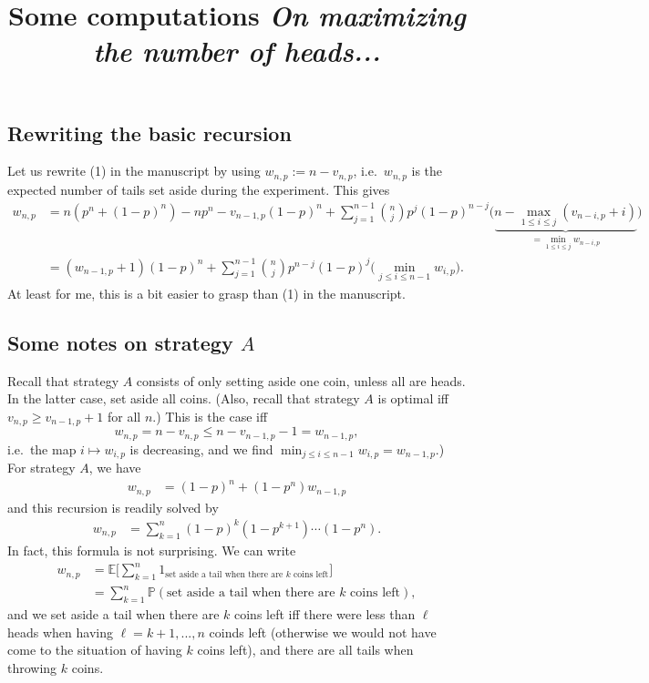 \documentclass{article}
\theoremstyle{definition}
\theoremstyle{step} \newtheorem{step}{Step}
\begin{document}
\title{\LARGE Some computations {\em On maximizing the number of
    heads...}}

\maketitle

\subsection*{Rewriting the basic recursion}
Let us rewrite (1) in the manuscript by using $w_{n,p} := n -
v_{n,p}$, i.e.\ $w_{n,p}$ is the expected number of tails set aside
during the experiment. This gives
\begin{align*}
  w_{n,p} & = n(p^n + (1-p)^n) - np^n - v_{n-1,p}(1-p)^n +
  \sum_{j=1}^{n-1} \binom nj p^j(1-p)^{n-j}\Big(\underbrace{n -
    \max_{1 \leq i \leq j} (v_{n-i,p} + i)}_{ = \min_{1\leq i\leq j}
    w_{n-i,p}} \Big)\\ & = (w_{n-1,p} + 1) (1-p)^n + \sum_{j=1}^{n-1}
  \binom n j p^{n-j} (1-p)^{j} \Big( \min_{j \leq i \leq n-1}
  w_{i,p}\Big).
\end{align*}
At least for me, this is a bit easier to grasp than (1) in the
manuscript.

\subsection*{Some notes on strategy $A$}
Recall that strategy $A$ consists of only setting aside one coin,
unless all are heads. In the latter case, set aside all coins. (Also,
recall that strategy $A$ is optimal iff $v_{n,p} \geq v_{n-1,p} + 1$
for all $n$.) This is the case iff
$$w_{n,p} = n - v_{n,p} \leq n - v_{n-1,p} - 1 = w_{n-1,p},$$
i.e.\ the map $i\mapsto w_{i,p}$ is decreasing, and we find $\min_{j
  \leq i \leq n-1} w_{i,p} = w_{n-1,p}$.) For strategy $A$, we have
\begin{align*}
  w_{n,p} & = (1-p)^n + (1-p^n) w_{n-1,p}
\end{align*}
and this recursion is readily solved by
\begin{align*}
  w_{n,p} & = \sum_{k=1}^n (1-p)^k (1-p^{k+1})\cdots (1-p^n).
\end{align*}
In fact, this formula is not surprising. We can write
\begin{align*}
  w_{n,p} & = \mathbb E\Big[\sum_{k=1}^n 1_{\text{set aside a tail
        when there are $k$ coins left}}\Big] \\ & = \sum_{k=1}^n
  \mathbb P(\text{set aside a tail when there are $k$ coins left}),
\end{align*}
and we set aside a tail when there are $k$ coins left iff there were
less than $\ell$ heads when having $\ell = k+1,...,n$ coinds left
(otherwise we would not have come to the situation of having $k$ coins
left), and there are all tails when throwing $k$ coins.
\end{document}
